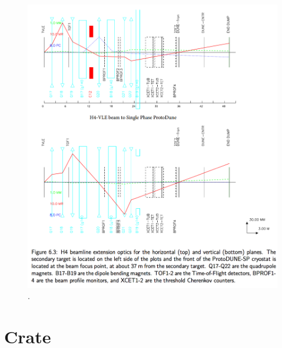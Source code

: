 \documentclass{report}
\begin{document}
   \begin{figure}[H]
     \centering
         \includegraphics[width=175mm]{beam_instr.png}
         \caption{.}
 \end{figure}
 
\chapter{Crate}
 
\end{document}
